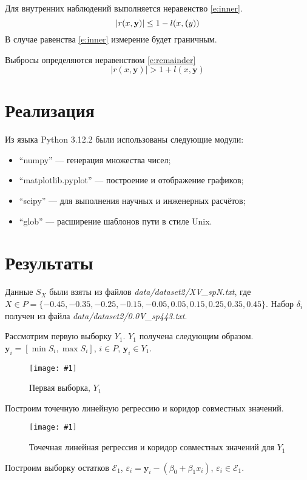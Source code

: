 \documentclass[a4paper,12pt]{article}
\newcommand{\plot}[3]{
  \begin{figure}[H]
    \begin{center}
      \texttt{[image: \#1]}
      \caption{#2}
      \label{#3}
    \end{center}
  \end{figure}
}
\begin{document}
Для внутренних наблюдений выполняется неравенство \ref{e:inner}.
\begin{equation}
  |r(x, \textbf{y})| \leq 1 - l(x, \textbf(y))
  \label{e:inner}
\end{equation}
В случае равенства \ref{e:inner} измерение будет граничным.

Выбросы определяются неравенством \ref{e:remainder}
\begin{equation}
  |r(x, \textbf{y})| > 1 + l(x, \textbf{y})
  \label{e:remainder}
\end{equation}

\section{Реализация}
\quad Из языка Python 3.12.2 были использованы следующие модули:
\begin{itemize}
  \item ``numpy'' --- генерация множества чисел;
  \item ``matplotlib.pyplot'' --- построение и отображение графиков;
  \item ``scipy'' --- для выполнения научных и инженерных расчётов;
  \item ``glob'' --- расширение шаблонов пути в стиле Unix.
\end{itemize}

\section{Результаты}
\quad Данные $ S_X $ были взяты из файлов \textsl{data/dataset2/XV\_spN.txt}, \newline
где $ X \in P = \{-0.45, -0.35, -0.25, -0.15, -0.05, 0.05, 0.15, 0.25, 0.35, 0.45 \} $.
Набор $ \delta_i $ получен из файла \textsl{data/dataset2/0.0V\_sp443.txt}.

Рассмотрим первую выборку $ Y_1 $. $ Y_1 $ получена следующим образом.
$ \textbf{y}_i = [\min{S_i}, \max{S_i}]$, $ i \in P $, $ \textbf{y}_i \in Y_1 $.
\plot{./images/SampleX1}{Первая выборка, $ Y_1 $}{p:sampleX1}

Построим точечную линейную регрессию и коридор совместных значений.
\plot{./images/InformSetCorridorX1}{Точечная линейная регрессия и коридор совместных значений для $ Y_1 $}{p:informSetCorridorX1}

Построим выборку остатков $ \mathcal{E}_1 $, $ \varepsilon_i = \textbf{y}_i - (\beta_0 + \beta_1 x_i) $,
$ \varepsilon_i \in \mathcal{E}_1 $.
\end{document}
